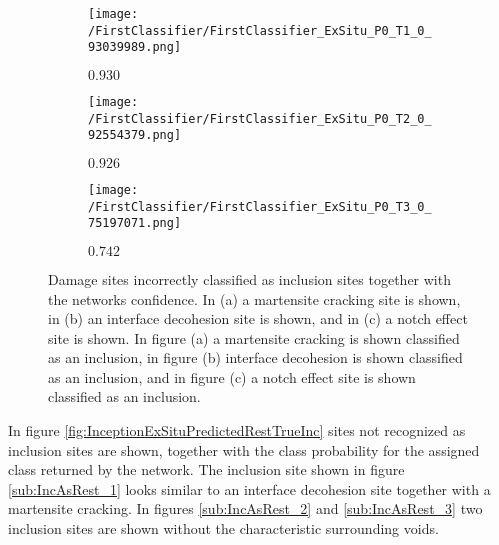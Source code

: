 \begin{figure}[H]
\centering
\begin{subfigure}{.3\textwidth}
\texttt{[image: /FirstClassifier/FirstClassifier\_ExSitu\_P0\_T1\_0\_93039989.png]}
\caption{$0.930$}
\label{sub:MasInc}
\end{subfigure}
\centering
\begin{subfigure}{.3\textwidth}
\texttt{[image: /FirstClassifier/FirstClassifier\_ExSitu\_P0\_T2\_0\_92554379.png]}
\caption{$0.926$}
\label{sub:IDasInc1}
\end{subfigure}
\centering
\begin{subfigure}{.3\textwidth}
\texttt{[image: /FirstClassifier/FirstClassifier\_ExSitu\_P0\_T3\_0\_75197071.png]}
\caption{$0.742$}
\label{sub:IDasInc2}
\end{subfigure}
\caption{Damage sites incorrectly classified as inclusion sites together with the networks confidence. In (a) a martensite cracking site is shown, in (b) an interface decohesion site is shown, and in (c) a notch effect site is shown.
 In figure (a) a martensite cracking is shown classified as an inclusion, in figure (b) interface decohesion is shown classified as an inclusion, and in figure (c) a notch effect site is shown classified as an inclusion.} 
\label{fig:InceptionExSituPredictedIncTrueRest}
\end{figure}

In figure \ref{fig:InceptionExSituPredictedRestTrueInc} sites not recognized as inclusion sites are shown, together with the class probability for the assigned class returned by the network. The inclusion site shown in figure \ref{sub:IncAsRest_1} looks similar to an interface decohesion site together with a martensite cracking. In figures \ref{sub:IncAsRest_2} and \ref{sub:IncAsRest_3} two inclusion sites are shown without the characteristic surrounding voids. 

